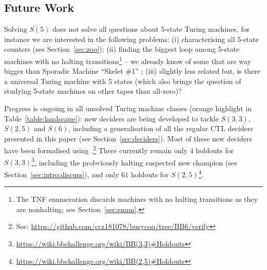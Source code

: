 \documentclass[letterpaper,british,11pt]{article}
\theoremstyle{definition} %
\numberwithin{equation}{section}
\theoremstyle{definition} %
\begin{document}
















% 

\subsection{Future Work}\label{sec:fw}

Solving $S(5)$ does not solve all questions about $5$-state Turing machines, for instance we are interested in the following problems: (i) characterising all 5-state counters (see Section~\ref{sec:zoo}); (ii) finding the biggest loop among 5-state machines with no halting transitions\footnote{The TNF enumeration discards machines with no halting transitions as they are nonhalting; see Section~\ref{sec:enum}.} -- we already know of some that are way bigger than Sporadic Machine ``Skelet \#1'' \cite{ligocki2022motherofgiants}; (iii) slightly less related but, is there a universal Turing machine with 5 states (which also brings the question of studying 5-state machines on other tapes than all-zero)?

Progress is ongoing in all unsolved Turing machine classes (orange highlight in Table~\ref{table:landscape}): new deciders are being developed to tackle $S(3,3)$, $S(2,5)$ and $S(6)$, including a generalisation of all the regular CTL deciders presented in this paper (see Section~\ref{sec:deciders}). Most of these new deciders have been formalised using \Coq.\footnote{See: \url{https://github.com/ccz181078/busycoq/tree/BB6/verify}} There currently remain only $4$ holdouts for $S(3,3)$\footnote{\url{https://wiki.bbchallenge.org/wiki/BB(3,3)\#Holdouts}}, including the probviously halting suspected new champion (see Section~\ref{sec:intro:discuss}), and only $61$ holdouts for $S(2,5)$\footnote{\url{https://wiki.bbchallenge.org/wiki/BB(2,5)\#Holdouts}}.
\end{document}

